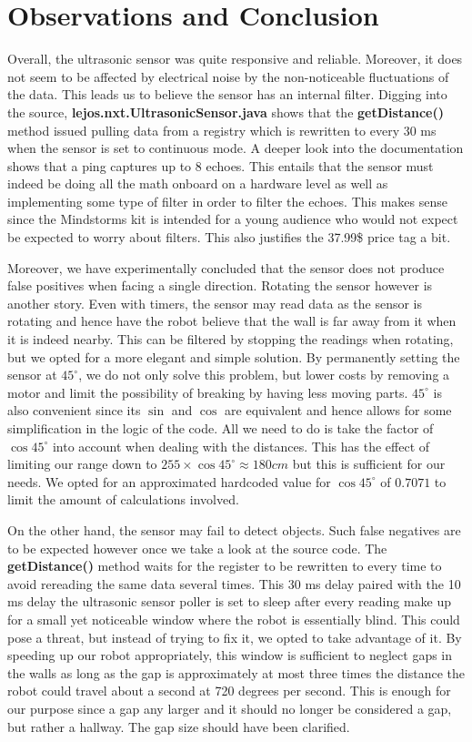 \documentclass[letterpaper,12pt]{article}
\begin{document}
\section{Observations and Conclusion}{Overall, the ultrasonic sensor was quite responsive and reliable. Moreover, it does not seem to be affected by electrical noise by the non-noticeable fluctuations of the data. This leads us to believe the sensor has an internal filter. Digging into the source, \textbf{lejos.nxt.UltrasonicSensor.java} shows that the \textbf{getDistance()} method issued pulling data from a registry which is rewritten to every 30 ms when the sensor is set to continuous mode. A deeper look into the documentation shows that a ping captures up to 8 echoes. This entails that the sensor must indeed be doing all the math onboard on a hardware level as well as implementing some type of filter in order to filter the echoes. This makes sense since the Mindstorms kit is intended for a young audience who would not expect be expected to worry about filters. This also justifies the 37.99\$ price tag a bit.

Moreover, we have experimentally concluded that the sensor does not produce false positives when facing a single direction. Rotating the sensor however is another story. Even with timers, the sensor may read data as the sensor is rotating and hence have the robot believe that the wall is far away from it when it is indeed nearby. This can be filtered by stopping the readings when rotating, but we opted for a more elegant and simple solution. By permanently setting the sensor at $45^{\circ}$, we do not only solve this problem, but lower costs by removing a motor and limit the possibility of breaking by having less moving parts. $45^{\circ}$ is also convenient since its $\sin{}$ and $\cos{}$ are equivalent and hence allows for some simplification in the logic of the code. All we need to do is take the factor of $\cos{45^{\circ}}$ into account when dealing with the distances. This has the effect of limiting our range down to $255 \times \cos{45^{\circ}} \approx 180 cm$ but this is sufficient for our needs. We opted for an approximated hardcoded value for $\cos{45^{\circ}}$ of $0.7071$ to limit the amount of calculations involved.

On the other hand, the sensor may fail to detect objects. Such false negatives are to be expected however once we take a look at the source code. The \textbf{getDistance()} method waits for the register to be rewritten to every time to avoid rereading the same data several times. This 30 ms delay paired with the 10 ms delay the ultrasonic sensor poller is set to sleep after every reading make up for a small yet noticeable window where the robot is essentially blind. This could pose a threat, but instead of trying to fix it, we opted to take advantage of it. By speeding up our robot appropriately, this window is sufficient to neglect gaps in the walls as long as the gap is approximately at most three times the distance the robot could travel about a second at 720 degrees per second. This is enough for our purpose since a gap any larger and it should no longer be considered a gap, but rather a hallway. The gap size should have been clarified.

}
\end{document}
